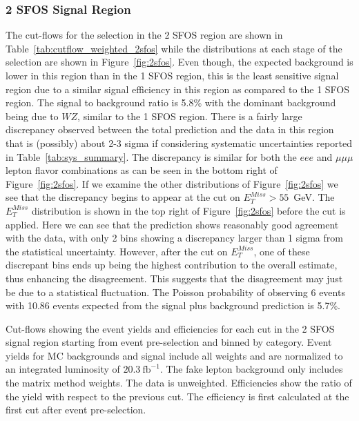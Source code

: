 \subsubsection{2 SFOS Signal Region}
The cut-flows for the selection in the 2 SFOS region are shown in Table~\ref{tab:cutflow_weighted_2sfos}
while the distributions at each stage of the selection are shown in Figure~\ref{fig:2sfos}.
Even though, the expected background is lower in this region than in the 1 SFOS region, this is the least sensitive signal region 
due to a similar signal efficiency in this region as compared to the 1 SFOS region.
The signal to background ratio is 5.8\% with the dominant background being due to $WZ$, similar to the 1 SFOS region.
There is a fairly large discrepancy observed between the total prediction and the data in this region that is (possibly)
about 2-3 sigma if considering systematic uncertainties reported in Table~\ref{tab:sys_summary}.
The discrepancy is similar for both the $eee$ and $\mu\mu\mu$ lepton flavor combinations as can be seen in the bottom
right of Figure~\ref{fig:2sfos}. If we examine the other distributions of Figure~\ref{fig:2sfos} we see that
the discrepancy begins to appear at the cut on $E_{T}^{Miss} > 55$~GeV. The $E_{T}^{Miss}$ distribution is shown in the
top right of Figure~\ref{fig:2sfos} before the cut is applied. Here we can see that the prediction shows reasonably good
agreement with the data, with only 2 bins showing a discrepancy larger than 1 sigma from the statistical uncertainty. However,
after the cut on $E_{T}^{Miss}$, one of these discrepant bins ends up being the highest contribution to the overall estimate, thus
enhancing the disagreement. This suggests that the disagreement may just be due to a statistical fluctuation.
The Poisson probability of observing 6 events with 10.86 events expected from the signal plus background prediction is 5.7\%.

\begin{table}[ht!]
\centering
\scriptsize

\caption{Cut-flows showing the event yields and efficiencies for each cut in the 2 SFOS signal region
starting from event pre-selection and binned by category. 
Event yields for MC backgrounds and signal include all weights and are normalized to an integrated luminosity of $20.3~\mathrm{fb}^{-1}$.  
The fake lepton background only includes the matrix method weights.  The data is unweighted.
Efficiencies show the ratio of the yield with respect
to the previous cut.  The efficiency is first calculated at the first cut after event pre-selection.  }
\label{tab:cutflow_weighted_2sfos}
\end{table}


